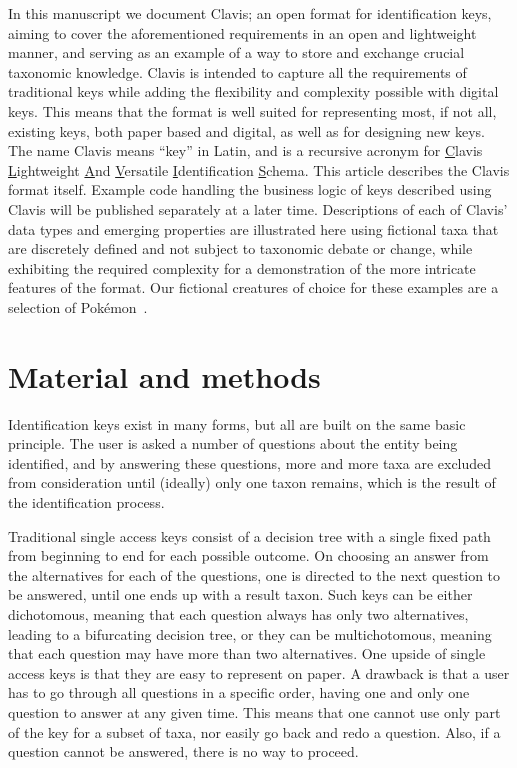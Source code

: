 \documentclass[10pt,letterpaper]{article}
\begin{document}
In this manuscript we document Clavis; an open format for identification keys, aiming to cover the aforementioned requirements in an open and lightweight manner, and serving as an example of a way to store and exchange crucial taxonomic knowledge. Clavis is intended to capture all the requirements of traditional keys while adding the flexibility and complexity possible with digital keys. This means that the format is well suited for representing most, if not all, existing keys, both paper based and digital, as well as for designing new keys. The name Clavis means ``key'' in Latin, and is a recursive acronym for \underline{C}lavis \underline{L}ightweight \underline{A}nd \underline{V}ersatile \underline{I}dentification \underline{S}chema. This article describes the Clavis format itself. Example code handling the business logic of keys described using Clavis will be published separately at a later time. Descriptions of each of Clavis' data types and emerging properties are illustrated here using fictional taxa that are discretely defined and not subject to taxonomic debate or change, while exhibiting the required complexity for a demonstration of the more intricate features of the format. Our fictional creatures of choice for these examples are a selection of Pokémon~\cite{Pokemon_wiki}.

\section*{
Material and methods
}
Identification keys exist in many forms, but all are built on the same basic principle. The user is asked a number of questions about the entity being identified, and by answering these questions, more and more taxa are excluded from consideration until (ideally) only one taxon remains, which is the result of the identification process.

Traditional single access keys consist of a decision tree with a single fixed path from beginning to end for each possible outcome. On choosing an answer from the alternatives for each of the questions, one is directed to the next question to be answered, until one ends up with a result taxon. Such keys can be either dichotomous, meaning that each question always has only two alternatives, leading to a bifurcating decision tree, or they can be multichotomous, meaning that each question may have more than two alternatives. One upside of single access keys is that they are easy to represent on paper. A drawback is that a user has to go through all questions in a specific order, having one and only one question to answer at any given time. This means that one cannot use only part of the key for a subset of taxa, nor easily go back and redo a question. Also, if a question cannot be answered, there is no way to proceed.
\end{document}
